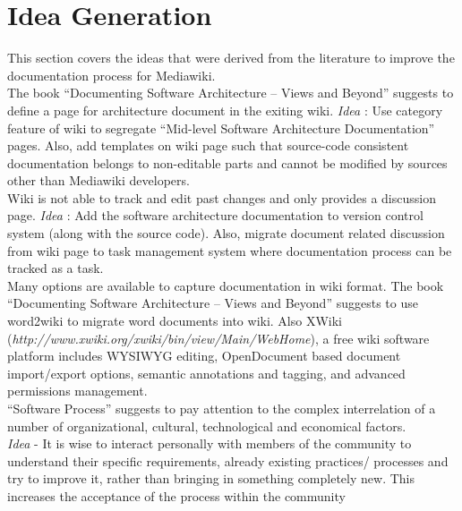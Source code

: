\section{Idea Generation}
\indent This section covers the ideas that were derived from the literature to improve the documentation process for Mediawiki.
\\\indent The book \enquote{Documenting Software Architecture – Views and Beyond} \cite{BachmannDocumentingSoftware2010} suggests to define a page for architecture document in the exiting wiki.
\emph{Idea} : Use category feature of wiki to segregate \enquote{Mid-level Software Architecture Documentation} pages. Also, add templates on wiki page such that source-code consistent documentation belongs to non-editable parts and cannot be modified by sources other than Mediawiki developers.
\newline
\\\indent Wiki is not able to track and edit past changes and only provides a discussion page.
\emph{Idea} : Add the software architecture documentation to version control system (along with the source code). Also, migrate document related discussion from wiki page to task management system where documentation process can be tracked as a task.
\\\indent Many options are available to capture documentation in wiki format. The book \enquote{Documenting Software Architecture – Views and Beyond} \cite{BachmannDocumentingSoftware2010} suggests to use word2wiki to migrate word documents into wiki. Also XWiki (\emph{http://www.xwiki.org/xwiki/bin/view/Main/WebHome}), a free wiki software platform includes WYSIWYG editing, OpenDocument based document import/export options, semantic annotations and tagging, and advanced permissions management.
\newline
\\\indent \enquote{Software Process} \cite{Fuggeffa1988} suggests to pay attention to the complex interrelation of a number of organizational, cultural, technological and economical factors.
\\\indent\emph{Idea}	- It is wise to interact personally with members of the community to understand their specific requirements, already existing practices/ processes and try to improve it, rather than bringing in something completely new. This increases the acceptance of the process within the community
\newline

